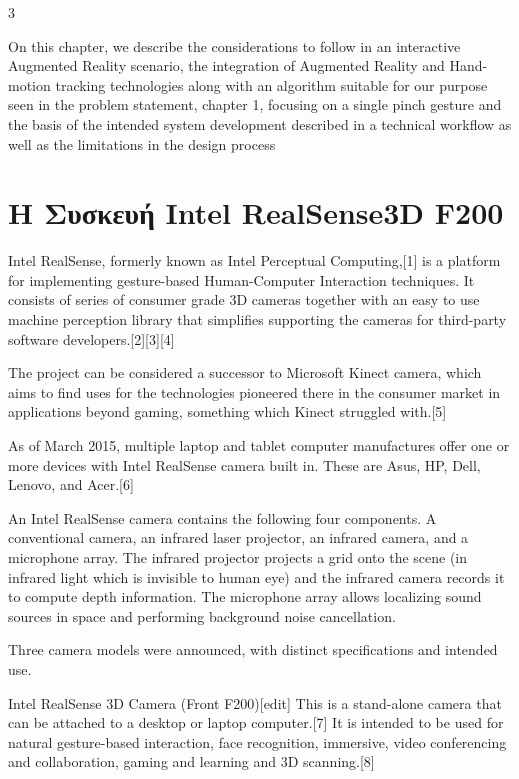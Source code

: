 3%


 \label{c:crypto}
On this chapter, we describe the considerations to follow in an interactive Augmented Reality
scenario, the integration of Augmented Reality and Hand-motion tracking technologies along
with an algorithm suitable for our purpose seen in the problem statement, chapter 1, focusing on
a single pinch gesture and the basis of the intended system development described in a technical
workflow as well as the limitations in the design process

\section{Η Συσκευή Intel RealSense\textregistered 3D F200 }

Intel RealSense\textregistered, formerly known as Intel Perceptual Computing,[1] is a platform for implementing gesture-based Human-Computer Interaction techniques. It consists of series of consumer grade 3D cameras together with an easy to use machine perception library that simplifies supporting the cameras for third-party software developers.[2][3][4]

The project can be considered a successor to Microsoft Kinect camera, which aims to find uses for the technologies pioneered there in the consumer market in applications beyond gaming, something which Kinect struggled with.[5]

As of March 2015, multiple laptop and tablet computer manufactures offer one or more devices with Intel RealSense camera built in. These are Asus, HP, Dell, Lenovo, and Acer.[6]

An Intel RealSense camera contains the following four components. A conventional camera, an infrared laser projector, an infrared camera, and a microphone array. The infrared projector projects a grid onto the scene (in infrared light which is invisible to human eye) and the infrared camera records it to compute depth information. The microphone array allows localizing sound sources in space and performing background noise cancellation.

Three camera models were announced, with distinct specifications and intended use.

Intel RealSense 3D Camera (Front F200)[edit]
This is a stand-alone camera that can be attached to a desktop or laptop computer.[7] It is intended to be used for natural gesture-based interaction, face recognition, immersive, video conferencing and collaboration, gaming and learning and 3D scanning.[8]

